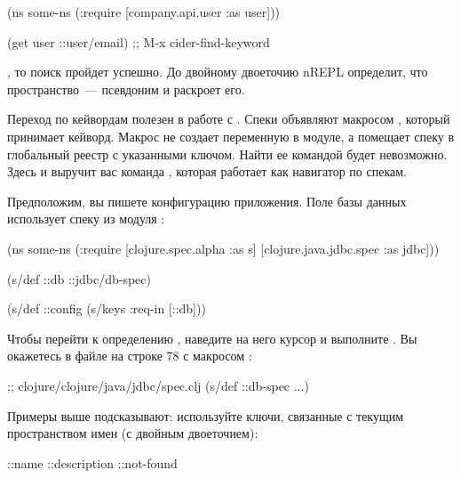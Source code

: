\begin{english}
  \begin{clojure}
(ns some-ns
  (:require
   [company.api.user :as user]))

(get user ::user/email) ;; M-x cider-find-keyword
  \end{clojure}
\end{english}

, то поиск пройдет успешно. До двойному двоеточию nREPL определит, что пространство~--- псевдоним и раскроет его.

Переход по кейвордам полезен в работе с . Спеки объявляют макросом , который принимает кейворд. Макрос не создает переменную в модуле, а помещает спеку в глобальный реестр с указанными ключом. Найти ее командой  будет невозможно. Здесь и выручит вас команда , которая работает как навигатор по спекам.

Предположим, вы пишете конфигурацию приложения. Поле  базы данных использует спеку из модуля :

\begin{english}
  \begin{clojure}
(ns some-ns
  (:require
   [clojure.spec.alpha :as s]
   [clojure.java.jdbc.spec :as jdbc]))

(s/def ::db ::jdbc/db-spec)

(s/def ::config
  (s/keys :req-in [::db]))
  \end{clojure}
\end{english}

Чтобы перейти к определению , наведите на него курсор и выполните . Вы окажетесь в файле  на строке 78 с макросом :

\begin{english}
  \begin{clojure}
;; clojure/clojure/java/jdbc/spec.clj
(s/def ::db-spec ...)
  \end{clojure}
\end{english}

Примеры выше подсказывают: используйте ключи, связанные с текущим пространством имен (с двойным двоеточием):

\begin{english}
  \begin{clojure}
::name
::description
::not-found
  \end{clojure}
\end{english}

